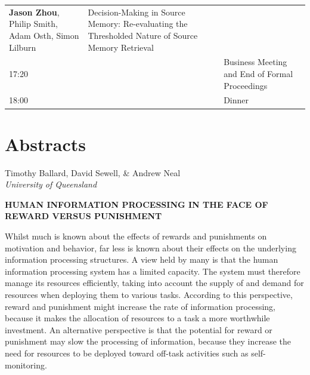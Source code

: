 \documentclass[]{article}
\begin{document}
\begin{longtable}[]{@{}lll@{}}
\begin{minipage}[t]{0.32\columnwidth}
\textbf{Jason Zhou}, Philip Smith, Adam Osth, Simon Lilburn\strut
\end{minipage} & \begin{minipage}[t]{0.57\columnwidth}\raggedright\strut
Decision-Making in Source Memory: Re-evaluating the Thresholded Nature
of Source Memory Retrieval\strut
\end{minipage}\tabularnewline
\begin{minipage}[t]{0.03\columnwidth}\raggedright\strut
17:20\strut
\end{minipage} & \begin{minipage}[t]{0.32\columnwidth}\raggedright\strut
\strut
\end{minipage} & \begin{minipage}[t]{0.57\columnwidth}\raggedright\strut
Business Meeting and End of Formal Proceedings\strut
\end{minipage}\tabularnewline
\begin{minipage}[t]{0.03\columnwidth}\raggedright\strut
18:00\strut
\end{minipage} & \begin{minipage}[t]{0.32\columnwidth}\raggedright\strut
\strut
\end{minipage} & \begin{minipage}[t]{0.57\columnwidth}\raggedright\strut
Dinner\strut
\end{minipage}\tabularnewline
\bottomrule
\end{longtable}

\pagebreak

\section{Abstracts}\label{abstracts}

Timothy Ballard, David Sewell, \& Andrew Neal\\
\emph{University of Queensland}

\textbf{HUMAN INFORMATION PROCESSING IN THE FACE OF REWARD VERSUS
PUNISHMENT}

Whilst much is known about the effects of rewards and punishments on
motivation and behavior, far less is known about their effects on the
underlying information processing structures. A view held by many is
that the human information processing system has a limited capacity. The
system must therefore manage its resources efficiently, taking into
account the supply of and demand for resources when deploying them to
various tasks. According to this perspective, reward and punishment
might increase the rate of information processing, because it makes the
allocation of resources to a task a more worthwhile investment. An
alternative perspective is that the potential for reward or punishment
may slow the processing of information, because they increase the need
for resources to be deployed toward off-task activities such as
self-monitoring.
\end{document}
